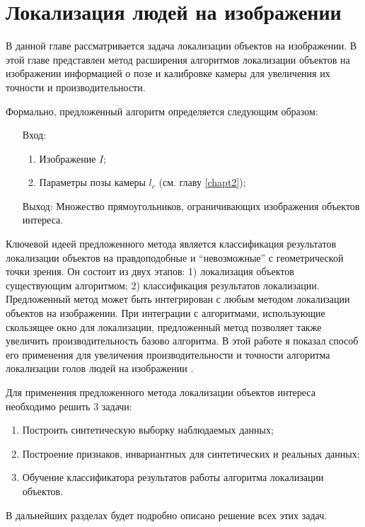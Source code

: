 
\chapter{Локализация людей на изображении} \label{chapt3}

В данной главе рассматривается задача локализации объектов на изображении. В этой главе представлен метод расширения алгоритмов локализации объектов на изображении информацией о позе и калибровке камеры для увеличения их точности и производительности.

Формально, предложенный алгоритм определяется следующим образом:
\begin{itemize}
	\item[Вход:]
	\begin{enumerate}
		\item Изображение $I$;
		\item Параметры позы камеры $l_c$ (см. главу \ref{chapt2});
	\end{enumerate}
	\item[Выход:] Множество прямоугольников, ограничивающих изображения объектов интереса.
\end{itemize}

Ключевой идеей предложенного метода является классификация результатов локализации объектов на правдоподобные и ``невозможные'' с геометрической точки зрения. Он состоит из двух этапов: 1) локализация объектов существующим алгоритмом; 2) классификация результатов локализации. Предложенный метод может быть интегрирован с любым методом локализации объектов на изображении. При интеграции с алгоритмами, использующие скользящее окно для локализации, предложенный метод позволяет также увеличить производительность базово алгоритма. В этой работе я показал способ его применения для увеличения производительности и точности алгоритма локализации голов людей на изображении \cite{prisacariu2009fasthog}.

Для применения предложенного метода локализации объектов интереса необходимо решить 3 задачи:
\begin{enumerate}
	\item Построить синтетическую выборку наблюдаемых данных;
	\item Построение признаков, инвариантных для синтетических и реальных данных;
	\item Обучение классификатора результатов работы алгоритма локализации объектов.
\end{enumerate}
В дальнейших разделах будет подробно описано решение всех этих задач.

